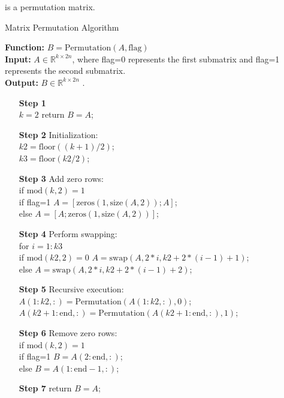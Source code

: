 \documentclass[5p,10pt]{elsarticle}
\numberwithin{equation}{section}
\begin{document}
is a permutation matrix.
\begin{algorithm}[htbp]
        \caption{Matrix Permutation Algorithm} \label{alg:Permutation}
        \textbf{Function:} $B=\text{Permutation}(A,\text{flag})$\\	
        \textbf{Input:}  $ A \in \mathbb{R}^{k \times 2n}$, where flag=0 represents the first submatrix and flag=1 represents the second submatrix.\\
        \textbf{Output:} $B \in \mathbb{R}^{k \times 2n}$ .
    \begin{itemize}
        \item[\textbf{Step 1}]\\
             $k=2$ \quad return $B=A$;
        \item[\textbf{Step 2}] Initialization:\\
            $k2 = \text{floor}((k+1)/2)$;\\
            $k3 = \text{floor}(k2/2)$;
        \item[\textbf{Step 3}] Add zero rows:\\
            if $\text{mod}(k, 2)=1$ \\
            if flag=1 \quad $A = [\text{zeros}(1, \text{size}(A, 2)); A]$;\\
            else  $A = [A; \text{zeros}(1, \text{size}(A, 2))]$;
        \item[\textbf{Step 4}] Perform swapping:\\
           for $i=1:k3$\\
           if $\text{mod}(k2, 2)=0$ \quad
            $A= \text{swap}(A,2*i,k2+2*(i-1)+1)$;\\
           else
            $A= \text{swap}(A,2*i,k2+2*(i-1)+2)$;
        \item[\textbf{Step 5}] Recursive execution:\\
           $A(1:k2, :) = \text{Permutation}(A(1:k2, :), 0)$;\\
           $A(k2+1:\text{end}, :) = \text{Permutation}(A(k2+1:\text{end}, :), 1)$;
        \item[\textbf{Step 6}] Remove zero rows: \\
           if $\text{mod}(k, 2)=1$ \\
           if flag=1 \quad $B = A(2:\text{end}, :)$;\\
           else $B = A(1:\text{end}-1, :)$;
        \item[\textbf{Step 7}] return $B=A$;
    \end{itemize}
\end{algorithm}
\end{document}
